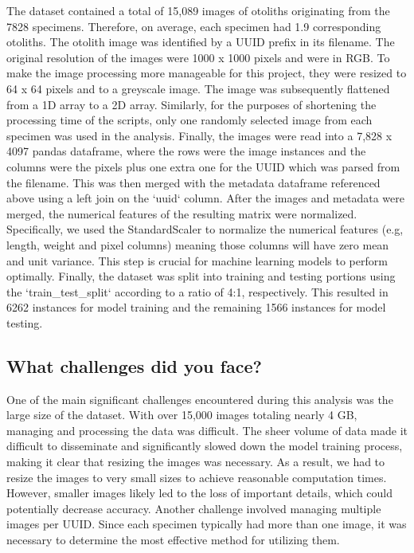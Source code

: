 The dataset contained a total of 15,089 images of otoliths originating from the 7828 specimens.
Therefore, on average, each specimen had 1.9 corresponding otoliths.
The otolith image was identified by a UUID prefix in its filename.
The original resolution of the images were 1000 x 1000 pixels and were in RGB.
To make the image processing more manageable for this project, they were resized to 64 x 64 pixels and to a greyscale image.
The image was subsequently flattened from a 1D array to a 2D array.
Similarly, for the purposes of shortening the processing time of the scripts, only one randomly selected image from each specimen was used in the analysis.
Finally, the images were read into a 7,828 x 4097 pandas dataframe, where the rows were the image instances and the columns were the pixels plus one extra one for the UUID which was parsed from the filename.
This was then merged with the metadata dataframe referenced above using a left join on the `uuid` column.
After the images and metadata were merged, the numerical features of the resulting matrix were normalized.
Specifically, we used the StandardScaler to normalize the numerical features (e.g, length, weight and pixel columns) meaning those columns will have zero mean and unit variance.
This step is crucial for machine learning models to perform optimally.
Finally, the dataset was split into training and testing portions using the `train\_test\_split` according to a ratio of 4:1, respectively.
This resulted in 6262 instances for model training and the remaining 1566 instances for model testing.

\subsection{What challenges did you face?}

One of the main significant challenges encountered during this analysis was the large size of the dataset.
With over 15,000 images totaling nearly 4 GB, managing and processing the data was difficult.
The sheer volume of data made it difficult to disseminate and significantly slowed down the model training process, making it clear that resizing the images was necessary.
As a result, we had to resize the images to very small sizes to achieve reasonable computation times.
However, smaller images likely led to the loss of important details, which could potentially decrease accuracy.
Another challenge involved managing multiple images per UUID.
Since each specimen typically had more than one image, it was necessary to determine the most effective method for utilizing them.

